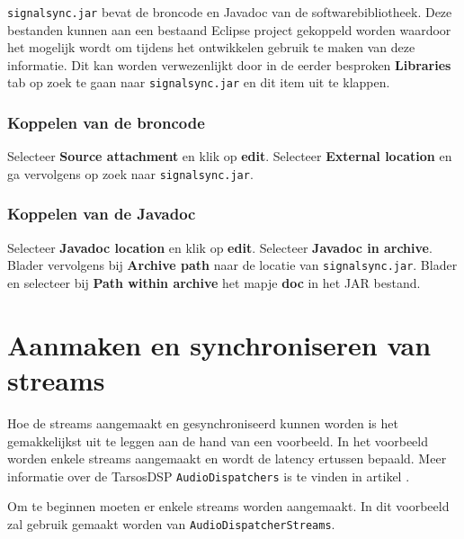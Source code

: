 \texttt{signalsync.jar} bevat de broncode en Javadoc van de softwarebibliotheek. Deze bestanden kunnen aan een bestaand Eclipse project gekoppeld worden waardoor het mogelijk wordt om tijdens het ontwikkelen gebruik te maken van deze informatie. Dit kan worden verwezenlijkt door in de eerder besproken \textbf{Libraries} tab op zoek te gaan naar \texttt{signalsync.jar} en dit item uit te klappen. 

\subsubsection{Koppelen van de broncode}

Selecteer \textbf{Source attachment} en klik op \textbf{edit}. Selecteer \textbf{External location} en ga vervolgens op zoek naar \texttt{signalsync.jar}.

\subsubsection{Koppelen van de Javadoc}

Selecteer \textbf{Javadoc location} en klik op \textbf{edit}. Selecteer \textbf{Javadoc in archive}. Blader vervolgens bij \textbf{Archive path} naar de locatie van \texttt{signalsync.jar}. Blader en selecteer bij \textbf{Path within archive} het mapje \textbf{doc} in het JAR bestand.

\section*{Aanmaken en synchroniseren van streams}

Hoe de streams aangemaakt en gesynchroniseerd kunnen worden is het gemakkelijkst uit te leggen aan de hand van een voorbeeld. In het voorbeeld worden enkele streams aangemaakt en wordt de latency ertussen bepaald. Meer informatie over de TarsosDSP \texttt{AudioDispatchers} is te vinden in artikel \cite{six2014tarsosdsp}.

Om te beginnen moeten er enkele streams worden aangemaakt. In dit voorbeeld zal gebruik gemaakt worden van \texttt{AudioDispatcherStreams}. \\

\lstset{basicstyle=\footnotesize,style=javaStyle}

